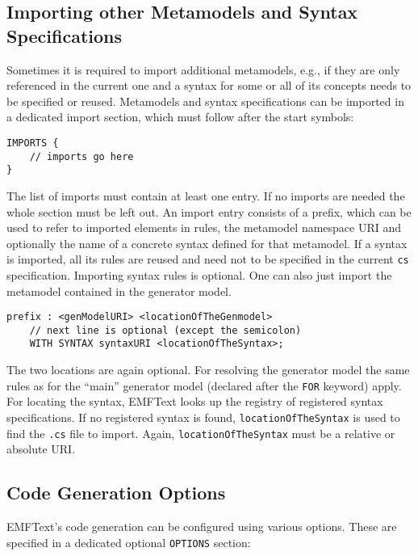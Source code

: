 \subsection{Importing other Metamodels and Syntax Specifications}
\label{sec:cs_import}
Sometimes it is required to import additional metamodels, e.g., if they are only
referenced in the current one and a syntax for some or all of its concepts
needs to be specified or reused. 
Metamodels and syntax specifications can be 
imported in a dedicated import section, which must follow after the start symbols:

\lstset{language=CS}
\begin{lstlisting}
IMPORTS {
    // imports go here
}
\end{lstlisting}

The list of imports must contain at least one entry. If no imports are 
needed the whole section must be left out. An import entry consists of a prefix, 
which can be used to refer to imported elements in rules, the metamodel
namespace URI and optionally the name of a concrete syntax defined for that
metamodel. If a syntax is imported, all its rules are reused and need not to be
specified in the current \texttt{cs} specification. Importing syntax rules is
optional. One can also just import the metamodel contained in the generator model.

\lstset{language=CS}
\begin{lstlisting}
prefix : <genModelURI> <locationOfTheGenmodel>
    // next line is optional (except the semicolon) 
    WITH SYNTAX syntaxURI <locationOfTheSyntax>;
\end{lstlisting}

The two locations are again optional. For resolving the generator model the same
rules as for the ``main'' generator model (declared after the \texttt{FOR}
keyword) apply. For locating the syntax, EMFText looks up the registry of
registered syntax specifications. If no registered syntax is found, 
\texttt{locationOfTheSyntax} is used to find the \texttt{.cs} file to import.
Again, \texttt{locationOfTheSyntax} must be a relative or absolute URI.

\subsection{Code Generation Options}

EMFText's code generation can be configured using various options. These are
specified in a dedicated optional \texttt{OPTIONS} section:

